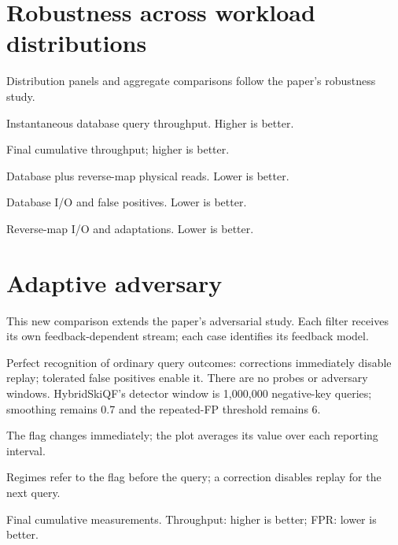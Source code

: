\section{Robustness across workload distributions}
Distribution panels and aggregate comparisons follow the paper's robustness study.

\begin{center}\small Instantaneous database query throughput. Higher is better.\end{center}

\begin{center}\small Final cumulative throughput; higher is better.\end{center}
\clearpage

\begin{center}\small Database plus reverse-map physical reads. Lower is better.\end{center}
\clearpage

\begin{center}\small Database I/O and false positives. Lower is better.\end{center}
\clearpage

\begin{center}\small Reverse-map I/O and adaptations. Lower is better.\end{center}
\clearpage
\section{Adaptive adversary}
This new comparison extends the paper's adversarial study. Each filter receives its own feedback-dependent stream; each case identifies its feedback model.

\begin{center}\small Perfect recognition of ordinary query outcomes: corrections immediately disable replay; tolerated false positives enable it. There are no probes or adversary windows. HybridSkiQF's detector window is 1,000,000 negative-key queries; smoothing remains 0.7 and the repeated-FP threshold remains 6.\end{center}

\begin{center}\small The flag changes immediately; the plot averages its value over each reporting interval.\end{center}

\begin{center}\small Regimes refer to the flag before the query; a correction disables replay for the next query.\end{center}

\begin{center}\small Final cumulative measurements. Throughput: higher is better; FPR: lower is better.\end{center}
